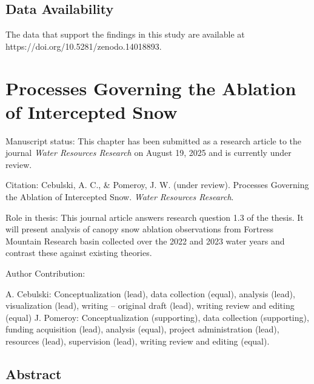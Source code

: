 \documentclass[
  letterpaper,
]{tex/uofsthesis-cs}
\begin{document}
\section{Data Availability}\label{data-availability}

The data that support the findings in this study are available at
https://doi.org/10.5281/zenodo.14018893.


\chapter{Processes Governing the Ablation of Intercepted
Snow}\label{processes-governing-the-ablation-of-intercepted-snow}

Manuscript status: This chapter has been submitted as a research article
to the journal \emph{Water Resources Research} on August 19, 2025 and is
currently under review.

Citation: Cebulski, A. C., \& Pomeroy, J. W. (under review). Processes
Governing the Ablation of Intercepted Snow. \emph{Water Resources
Research}.

Role in thesis: This journal article answers research question 1.3 of
the thesis. It will present analysis of canopy snow ablation
observations from Fortress Mountain Research basin collected over the
2022 and 2023 water years and contrast these against existing theories.

Author Contribution:

A. Cebulski: Conceptualization (lead), data collection (equal), analysis
(lead), visualization (lead), writing -- original draft (lead), writing
review and editing (equal) J. Pomeroy: Conceptualization (supporting),
data collection (supporting), funding acquisition (lead), analysis
(equal), project administration (lead), resources (lead), supervision
(lead), writing review and editing (equal).

\section{Abstract}\label{abstract-2}
\end{document}
